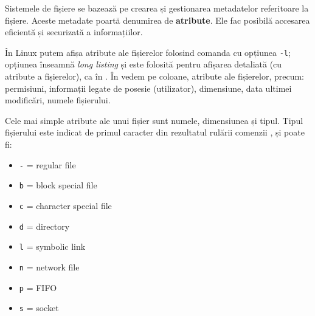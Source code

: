 Sistemele de fișiere se bazează pe crearea și gestionarea metadatelor referitoare la fișiere.
Aceste metadate poartă denumirea de \textbf{atribute}.
Ele fac posibilă accesarea eficientă și securizată a informațiilor.

În Linux putem afișa atribute ale fișierelor folosind comanda  cu opțiunea \texttt{-l};
opțiunea înseamnă \textit{long listing} și este folosită pentru afișarea detaliată (cu atribute a fișierelor), ca în .
În  vedem pe coloane, atribute ale fișierelor, precum: permisiuni, informații legate de posesie (utilizator), dimensiune, data ultimei modificări, numele fișierului.


Cele mai simple atribute ale unui fișier sunt numele, dimensiunea și tipul.
Tipul fișierului este indicat de primul caracter din rezultatul rulării comenzii , și poate fi:

\begin{itemize}
  \item \texttt{-} = regular file
  \item \texttt{b} = block special file
  \item \texttt{c} = character special file
  \item \texttt{d} = directory
  \item \texttt{l} = symbolic link
  \item \texttt{n} = network file
  \item \texttt{p} = FIFO
  \item \texttt{s} = socket
\end{itemize}

